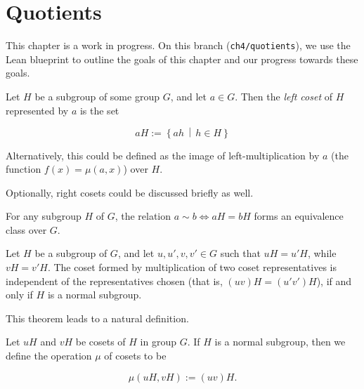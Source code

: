 
\chapter{Quotients}

This chapter is a work in progress. On this branch (\verb|ch4/quotients|), we
use the Lean blueprint to outline the goals of this chapter and our progress
towards these goals.

\begin{definition}
    \label{definition : Coset}
    Let $H$ be a subgroup of some group $G$, and let $a \in G$. Then the
    \emph{left coset} of $H$ represented by $a$ is the set

    \begin{equation*}
        aH := \left\{ ah \,\middle|\, h \in H \right\}
    \end{equation*}

    Alternatively, this could be defined as the image of left-multiplication by
    $a$ (the function $f(x) = \mu(a, x)$) over $H$.
\end{definition}

Optionally, right cosets could be discussed briefly as well.

\begin{theorem}
    \label{theorem : Coset_partition}
    For any subgroup $H$ of $G$, the relation $a \sim b \iff aH = bH$ forms an
    equivalence class over $G$.
\end{theorem}

\begin{theorem}
    \label{theorem : Coset.op_repr_indep}
    Let $H$ be a subgroup of $G$, and let $u,u',v,v' \in G$ such that $uH =
    u'H$, while $vH = v'H$. The coset formed by multiplication of two coset
    representatives is independent of the representatives chosen (that is,
    $(uv)H = (u'v')H$), if and only if $H$ is a normal subgroup.
\end{theorem}

This theorem leads to a natural definition.

\begin{definition}
    \label{definition : Coset.op}
    Let $uH$ and $vH$ be cosets of $H$ in group $G$. If $H$ is a normal
    subgroup, then we define the operation $\mu$ of cosets to be

    \begin{equation*}
        \mu(uH, vH) := (uv)H.
    \end{equation*}
\end{definition}

